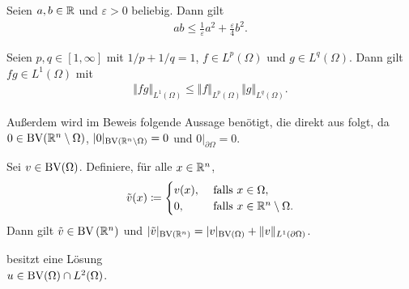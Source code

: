 \begin{lemma}
  \label{lem:young}
  Seien $a,b\in\mathbb{R}$ und $\varepsilon>0$ beliebig. Dann gilt
  \begin{align*}
    ab\leq\frac{1}{\varepsilon}a^2+\frac{\varepsilon}{4}b^2. 
  \end{align*}
\end{lemma}

\begin{lemma}
  \label{lem:hoelder}
  Seien $p,q\in [1,\infty]$ mit $1/p+1/q=1$, $f\in L^p(\Omega)$ und 
  $g\in L^q(\Omega)$. Dann gilt $fg\in L^1(\Omega)$ mit 
  \begin{align*}
    \Vert fg\Vert_{L^1(\Omega)}\leq 
    \Vert f\Vert_{L^p(\Omega)}\Vert g\Vert_{L^q(\Omega)}.
  \end{align*}
\end{lemma}



Außerdem wird im Beweis folgende Aussage benötigt, die direkt aus \cite[S. 183,
Theorem 1]{EG92} folgt, da $0\in\textup{BV}(\mathbb{R}^n\setminus\Omega)$,
$|0|_{\textup{BV}(\mathbb{R}^n\setminus\Omega)}=0$ und $0|_{\partial\Omega}=0$.

\begin{lemma}
  \label{lem:bvExtension}
  Sei $v\in\textup{BV}(\Omega)$.
  Definiere, für alle $x\in\mathbb{R}^n$,
  \begin{align*}
    \tilde{v}(x)\coloneqq
    \begin{cases}
      v(x),  &\text{ falls } x\in\Omega,\\
      0,     &\text{ falls } x\in\mathbb{R}^n\setminus\Omega.
    \end{cases} 
  \end{align*}
  Dann gilt $\tilde{v}\in\textup{BV}\left(\mathbb{R}^n\right)$ und
  $|\tilde{v}|_{\textup{BV}\left(\mathbb{R}^n\right)}
  = |v|_{\textup{BV}(\Omega)}+\Vert v\Vert_{L^1(\partial\Omega)}$.
\end{lemma}

\begin{theorem}
  \label{thm:contProblemExistence}
   besitzt eine Lösung \\$u\in\textup{BV}(\Omega)\cap
  L^2(\Omega)$.
\end{theorem}

